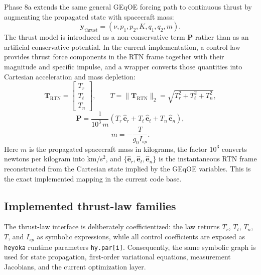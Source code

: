 \documentclass[11pt]{article}
\begin{document}
Phase 8a extends the same general GEqOE forcing path to continuous thrust by
augmenting the propagated state with spacecraft mass:
\begin{equation}
    \bm{y}_{\mathrm{thrust}} =
    (\nu, p_1, p_2, K, q_1, q_2, m).
\end{equation}
The thrust model is introduced as a non-conservative term $\bm{P}$ rather than
as an artificial conservative potential. In the current implementation, a
control law provides thrust force components in the RTN frame together with
their magnitude and specific impulse, and a wrapper converts those quantities
into Cartesian acceleration and mass depletion:
\begin{equation}
    \bm{T}_{\mathrm{RTN}} =
    \begin{bmatrix}
        T_r \\ T_t \\ T_n
    \end{bmatrix},
    \qquad
    T = \|\bm{T}_{\mathrm{RTN}}\|_2
    =
    \sqrt{T_r^2 + T_t^2 + T_n^2},
\end{equation}
\begin{equation}
    \bm{P}
    =
    \frac{1}{10^3\,m}
    \left(
        T_r \,\hat{\bm{e}}_r
        +
        T_t \,\hat{\bm{e}}_t
        +
        T_n \,\hat{\bm{e}}_n
    \right),
\end{equation}
\begin{equation}
    \dot{m} = -\frac{T}{g_0 I_{sp}}.
\end{equation}
Here $m$ is the propagated spacecraft mass in kilograms, the factor $10^3$
converts newtons per kilogram into km/s$^2$, and
$\{\hat{\bm{e}}_r,\hat{\bm{e}}_t,\hat{\bm{e}}_n\}$ is the instantaneous RTN
frame reconstructed from the Cartesian state implied by the GEqOE variables.
This is the exact implemented mapping in the current code base.

\subsection{Implemented thrust-law families}

The thrust-law interface is deliberately coefficientized: the law returns
$T_r$, $T_t$, $T_n$, $T$, and $I_{sp}$ as symbolic expressions, while all
control coefficients are exposed as \texttt{heyoka} runtime parameters
\texttt{hy.par[i]}. Consequently, the same symbolic graph is used for state
propagation, first-order variational equations, measurement Jacobians, and the
current optimization layer.
\end{document}
